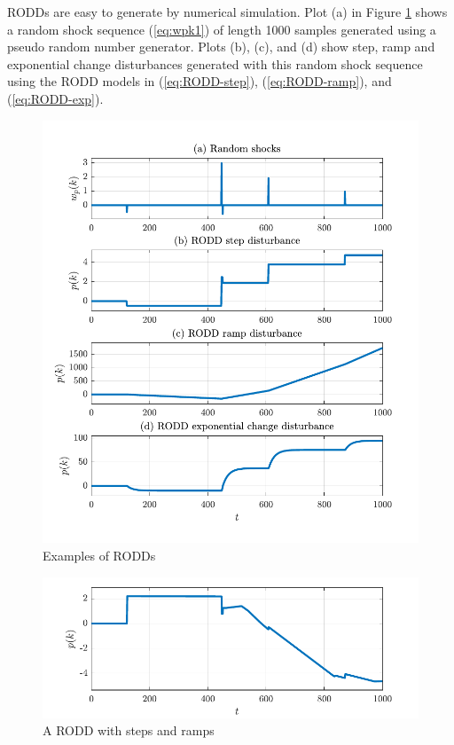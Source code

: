 RODDs are easy to generate by numerical simulation.  Plot (a) in Figure \ref{fig:rodd-sim-plots} shows a random shock sequence (\ref{eq:wpk1}) of length 1000 samples generated using a pseudo random number generator. Plots (b), (c), and (d) show step, ramp and exponential change disturbances generated with this random shock sequence using the RODD models in (\ref{eq:RODD-step}), (\ref{eq:RODD-ramp}), and (\ref{eq:RODD-exp}). 
\begin{figure}[htp]
	\centering
	\includegraphics[width=13cm]{images/rodd_sim_plots.pdf}
	\caption{Examples of RODDs}
	\label{fig:rodd-sim-plots}
\end{figure}
\begin{figure}[htp]
	\centering
	\includegraphics[width=13cm]{images/rodd_sim_plot2.pdf}
	\caption{A RODD with steps and ramps}
	\label{fig:rodd-sim-plot2}
\end{figure}


